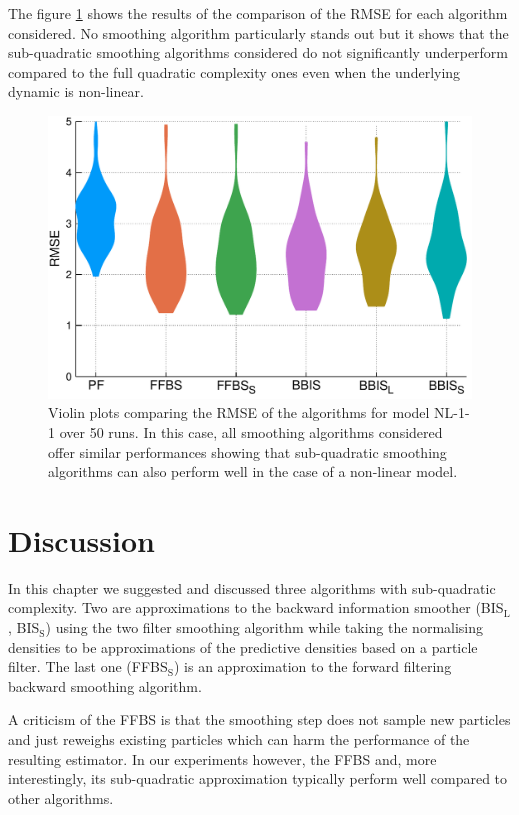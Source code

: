 The figure \ref{comp-nl-1} shows the results of the comparison of the RMSE for each algorithm considered. No smoothing algorithm particularly stands out but it shows that the sub-quadratic smoothing algorithms considered do not significantly underperform compared to the full quadratic complexity ones even when the underlying dynamic is non-linear.

\begin{figure}[!h]
\center
\includegraphics[width=.75\textwidth]{figures/tfs/comp_nl1_N50}
\caption{\label{comp-nl-1}Violin plots comparing the RMSE of the algorithms for model NL-1-1 over 50 runs. In this case, all smoothing algorithms considered offer similar performances showing that sub-quadratic smoothing algorithms can also perform well in the case of a non-linear model.}
\end{figure}



\section{Discussion}

In this chapter we suggested and discussed three algorithms with sub-quadratic complexity. 
Two are approximations to the backward information smoother (BIS$_{\text{L}}$, BIS$_{\text{S}}$) using the two filter smoothing algorithm while taking the normalising densities to be approximations of the predictive densities based on a particle filter. 
The last one (FFBS$_{\text{S}}$) is an approximation to the forward filtering backward smoothing algorithm. 

A criticism of the FFBS is that the smoothing step does not sample new particles and just reweighs existing particles which can harm the performance of the resulting estimator. In our experiments however, the FFBS and, more interestingly, its sub-quadratic approximation typically perform well compared to other algorithms. 

